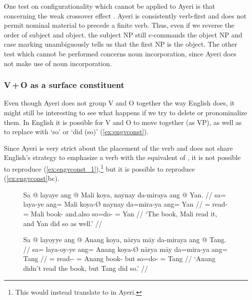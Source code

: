 One test on configurationality which cannot be applied to Ayeri is that
concerning the weak crossover effect \citep[133--135]{speas1990}. Ayeri is
consistently verb-first and does not permit nominal material to precede a
finite verb. Thus, even if we reverse the order of subject and object, the
subject NP still c-commands the object NP and case marking unambiguously tells
us that the first NP is the object. The other test which cannot be performed
concerns noun incorporation, since Ayeri does not make use of noun
incorporation.

\subsubsection{V\,+\,O as a surface constituent}

Even though Ayeri does not group V and O together the way English does, it
might still be interesting to see what happens if we try to delete or
pronominalize them. In English it is possible for V and O to move together (as
VP), as well as to replace  with `so' or `did (so)'
(\ref{ex:engvconst}).

\begin{figure}[h]
\pex\label{ex:engvconst}
\a\label{ex:engvconst_1} 
\a\label{ex:engvconst_2} 
\a\label{ex:engvconst_3} 
\xe
\end{figure}

Since Ayeri is very strict about the placement of the verb and does not share
English's strategy to emphasize a verb with the equivalent of , it is
not possible to reproduce (\ref{ex:engvconst_1}),\footnote{This would instead
translate to  in Ayeri.} but it is possible to reproduce 
(\ref{ex:engvconst}bc).

\begin{figure}[h]
\pex\label{ex:ayrvconst1}
\a\label{ex:ayrvconst1_1}\begingl
	\gla Sa @ layaye ang @ Mali koya, naynay da-miraya ang @ Yan. //
	\glb sa= laya-ye ang= Mali koya-Ø naynay da=mira-ya ang= Yan //
	\glc \PatT{}= read-\TsgF{} \Aarg{}= Mali book-\Top{} and.also so=do-\TsgM{}
		\Aarg{}= Yan //
	\glft `The book, Mali read it, and Yan did so as well.' //
\endgl

\a\label{ex:ayrvconst1_2}\begingl
	\gla Sa @ layoyye ang @ Anang koya, nārya māy da-miraya ang @ Tang. //
	\glb sa= laya-oy-ye ang= Anang koya-Ø nārya māy da=mira-ya ang= Tang //
	\glc \PatT{}= read-\Neg{}-\TsgF{} \Aarg{}= Anang book-\Top{} but \Aff{}
		so=do-\TsgM{} \Aarg{}= Tang //
	\glft `Anang didn't read the book, but Tang did so.' //
\endgl
\xe
\end{figure}


